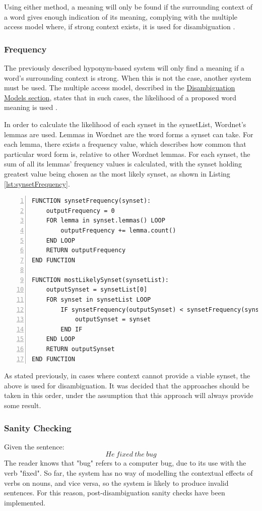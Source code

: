 \documentclass[]{article}
\begin{document}
Using either method, a meaning will only be found if the surrounding context of a word gives enough indication of its meaning, complying with the multiple access model where, if strong context exists, it is used for disambiguation \cite{PsychologyOfLanguage}.

\subsubsection{Frequency}
\label{sec:DisambiguationFrequency}
The previously described hyponym-based system will only find a meaning if a word's surrounding context is strong. When this is not the case, another system must be used. The multiple access model, described in the \hyperref[sec:DisambiguationModels]{Disambiguation Models section}, states that in such cases, the likelihood of a proposed word meaning is used \cite{PsychologyOfLanguage}.

In order to calculate the likelihood of each synset in the synsetList, Wordnet's lemmas are used. Lemmas in Wordnet are the word forms a synset can take. For each lemma, there exists a frequency value, which describes how common that particular word form is, relative to other Wordnet lemmas. For each synset, the sum of all its lemmas' frequency values is calculated, with the synset holding greatest value being chosen as the most likely synset, as shown in Listing \ref{lst:synsetFrequency}.

\begin{lstlisting}[numbers=left, numberstyle=\small, caption={The synsetFrequency and mostLikelySynset functions}, captionpos=b, label={lst:synsetFrequency}]
FUNCTION synsetFrequency(synset):
    outputFrequency = 0
    FOR lemma in synset.lemmas() LOOP
        outputFrequency += lemma.count()
    END LOOP
    RETURN outputFrequency
END FUNCTION

FUNCTION mostLikelySynset(synsetList):
    outputSynset = synsetList[0]
    FOR synset in synsetList LOOP
        IF synsetFrequency(outputSynset) < synsetFrequency(synset) THEN
            outputSynset = synset
        END IF
    END LOOP
    RETURN outputSynset
END FUNCTION
\end{lstlisting}

As stated previously, in cases where context cannot provide a viable synset, the above is used for disambiguation. It was decided that the approaches should be taken in this order, under the assumption that this approach will always provide some result.

\subsubsection{Sanity Checking}
\label{sec:Sanity}
Given the sentence:
\[He\: fixed\: the\: bug\]
The reader knows that "bug" refers to a computer bug, due to its use with the verb "fixed". So far, the system has no way of modelling the contextual effects of verbs on nouns, and vice versa, so the system is likely to produce invalid sentences. For this reason, post-disambiguation sanity checks have been implemented.
\end{document}
